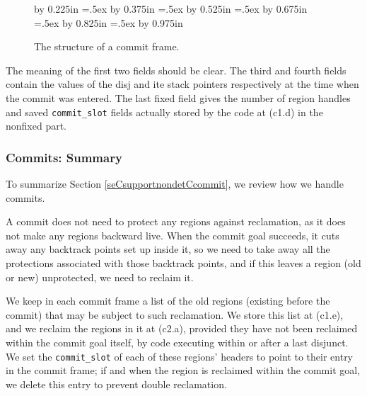 \documentclass{tlp}
\newcommand{\code}[1]{{\tt#1}}
\begin{document}
\begin{figure}[htp]
\begin{center}
{{    \advance\graphtemp by 0.225in
    \graphtemp=.5ex
    \advance\graphtemp by 0.375in
    \graphtemp=.5ex
    \advance\graphtemp by 0.525in
    \graphtemp=.5ex
    \advance\graphtemp by 0.675in
    \graphtemp=.5ex
    \advance\graphtemp by 0.825in
    \graphtemp=.5ex
    \advance\graphtemp by 0.975in
    \hbox{\vrule depth1.200in width0pt height 0pt}\kern 4.500in
  }}\centerline{\box\graph}
\end{center}
\caption{The structure of a commit frame.}
\label{fig:commitframe}
\end{figure}

The meaning of the first two fields should be clear.
The third and fourth fields contain
the values of the disj and ite stack pointers respectively
at the time when the commit was entered.
The last fixed field gives the number
of region handles and saved \code{commit\_slot} fields
actually stored by the code at (c1.d) in the nonfixed part.

\subsubsection{Commits: Summary}
To summarize Section \ref{seCsupportnondetCcommit},
we review how we handle commits.

A commit does not need to protect any regions against reclamation,
as it does not make any regions backward live.
When the commit goal succeeds,
it cuts away any backtrack points set up inside it,
so we need to take away all the protections
associated with those backtrack points,
and if this leaves a region (old or new) unprotected,
we need to reclaim it.

We keep in each commit frame
a list of the old regions (existing before the commit)
that may be subject to such reclamation.
We store this list at (c1.e),
and we reclaim the regions in it at (c2.a),
provided they have not been reclaimed within the commit goal itself,
by code executing within or after a last disjunct.
We set the \code{commit\_slot} of each of these regions' headers
to point to their entry in the commit frame;
if and when the region is reclaimed within the commit goal,
we delete this entry to prevent double reclamation.
\end{document}
